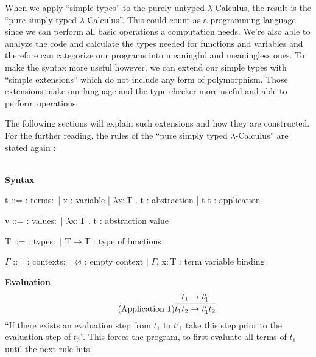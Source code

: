 When we apply ``simple types'' to the purely untyped
$\lambda$-Calculus, the result is the ``pure simply typed $\lambda$-Calculus''.
This could count as a programming language since we can perform
all basic operations a computation needs. We're also able to analyze
the code and calculate the types needed for functions and variables
and therefore can categorize our programs into meaningful and
meaningless ones. To make the syntax more useful however, we can extend
our simple types with ``simple extensions'' which do not include any
form of polymorphism. Those extensions make our language and the type
checker more useful and able to perform operations.

The following sections will explain such extensions and how they are constructed.
For the further reading, the rules of the ``pure simply typed $\lambda$-Calculus''
are stated again \cite{pierce2002ProgLang}:

~\\
\textbf{Syntax}
\begin{bnfgrammar}
    t ::= : terms$\colon$
    | x : variable
    | $\lambda$x$\colon$T . t : abstraction
    | t t : application
\end{bnfgrammar}\leavevmode\newline

\begin{bnfgrammar}
    v ::= : values$\colon$
    | $\lambda$x$\colon$T . t : abstraction value
\end{bnfgrammar}\leavevmode\newline

\begin{bnfgrammar}
    T ::= : types$\colon$
    | T$\rightarrow$T : type of functions
\end{bnfgrammar}\leavevmode\newline

\begin{bnfgrammar}
    $\Gamma$ ::= : contexts$\colon$
    | $\varnothing$ : empty context
    | $\Gamma$, x$\colon$T : term variable binding
\end{bnfgrammar}\leavevmode\newline

\textbf{Evaluation}
\begin{equation*}
    \tag{Application 1}
    \infer{
        t_1 t_2 \rightarrow t'_1 t_2
    }{
        t_1 \rightarrow t'_1
    }
\end{equation*}
``If there exists an evaluation step from $t_1$ to $t'_1$ take this step
prior to the evaluation step of $t_2$''. This forces the program, to first
evaluate all terms of $t_1$ until the next rule hits.

